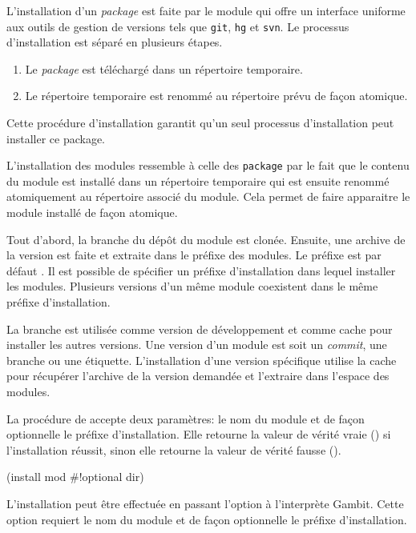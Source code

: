 L'installation d'un \textit{package} est faite par le module  qui
offre un interface uniforme aux outils de gestion de versions tels que
\texttt{git}, \texttt{hg} et \texttt{svn}.  Le processus d'installation est
séparé en plusieurs étapes.
\begin{enumerate}
  \item Le \textit{package} est téléchargé dans un répertoire temporaire.
  \item Le répertoire temporaire est renommé au répertoire prévu de façon atomique.
\end{enumerate}
Cette procédure d'installation garantit qu'un seul processus d'installation peut
installer ce package.

L'installation des modules ressemble à celle des \texttt{package} par le fait
que le contenu du module est installé dans un répertoire temporaire qui est
ensuite renommé atomiquement au répertoire associé du module.  Cela permet de
faire apparaitre le module installé de façon atomique.

Tout d'abord, la
branche  du dépôt du module est clonée. Ensuite, une archive de la
version est faite et extraite dans le préfixe des modules. Le préfixe est par
défaut .  Il est possible de spécifier un préfixe
d'installation dans lequel installer les modules. Plusieurs versions d'un même
module coexistent dans le même préfixe d'installation.

La branche  est utilisée comme version de développement et
comme cache pour installer les autres versions. Une version d'un module est soit
un \textit{commit}, une branche ou une étiquette. L'installation d'une version
spécifique utilise la cache pour récupérer l'archive de la version demandée
et l'extraire dans l'espace des modules.

La procédure  de  accepte deux paramètres:
le nom du module et de façon optionnelle le préfixe d'installation. Elle
retourne la valeur de vérité vraie () si l'installation réussit,
sinon elle retourne la valeur de vérité fausse ().
\begin{center}
  \begin{mplisting}{0.4}
(install mod #!optional dir)
\end{mplisting}
\end{center}

L'installation peut être effectuée en passant l'option 
à l'interprète Gambit. Cette option requiert le nom du module et
de façon optionnelle le préfixe d'installation.
\begin{center}
\end{center}


